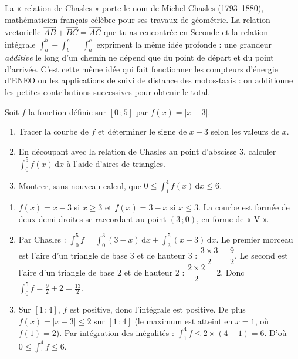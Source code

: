 \documentclass[11pt]{article}
\begin{document}
\begin{savaistu}
La « relation de Chasles » porte le nom de Michel Chasles (1793--1880), mathématicien français célèbre pour ses travaux de géométrie. La relation vectorielle $\overrightarrow{AB} + \overrightarrow{BC} = \overrightarrow{AC}$ que tu as rencontrée en Seconde et la relation intégrale $\int_a^b + \int_b^c = \int_a^c$ expriment la même idée profonde : une grandeur \emph{additive} le long d'un chemin ne dépend que du point de départ et du point d'arrivée. C'est cette même idée qui fait fonctionner les compteurs d'énergie d'ENEO ou les applications de suivi de distance des motos-taxis : on additionne les petites contributions successives pour obtenir le total.
\end{savaistu}

\begin{exercice}
Soit $f$ la fonction définie sur $[0\,;5]$ par $f(x) = |x - 3|$.
\begin{enumerate}
\item Tracer la courbe de $f$ et déterminer le signe de $x - 3$ selon les valeurs de $x$.
\item En découpant avec la relation de Chasles au point d'abscisse $3$, calculer $\displaystyle\int_0^5 f(x)\,\mathrm{d}x$ à l'aide d'aires de triangles.
\item Montrer, sans nouveau calcul, que $\displaystyle 0 \leq \int_1^4 f(x)\,\mathrm{d}x \leq 6$.
\end{enumerate}
\end{exercice}

\begin{corrige}[Exercice]
\begin{enumerate}
\item $f(x) = x - 3$ si $x \geq 3$ et $f(x) = 3 - x$ si $x \leq 3$. La courbe est formée de deux demi-droites se raccordant au point $(3\,;0)$, en forme de « V ».
\item Par Chasles : $\displaystyle\int_0^5 f = \int_0^3 (3-x)\,\mathrm{d}x + \int_3^5 (x-3)\,\mathrm{d}x$. Le premier morceau est l'aire d'un triangle de base $3$ et de hauteur $3$ : $\dfrac{3 \times 3}{2} = \dfrac{9}{2}$. Le second est l'aire d'un triangle de base $2$ et de hauteur $2$ : $\dfrac{2 \times 2}{2} = 2$. Donc $\displaystyle\int_0^5 f = \frac{9}{2} + 2 = \frac{13}{2}$.
\item Sur $[1\,;4]$, $f$ est positive, donc l'intégrale est positive. De plus $f(x) = |x-3| \leq 2$ sur $[1\,;4]$ (le maximum est atteint en $x = 1$, où $f(1) = 2$). Par intégration des inégalités : $\displaystyle\int_1^4 f \leq 2 \times (4-1) = 6$. D'où $0 \leq \displaystyle\int_1^4 f \leq 6$.
\end{enumerate}
\end{corrige}
\end{document}
